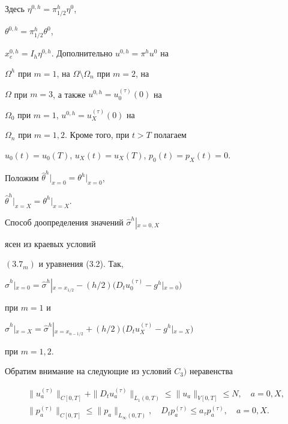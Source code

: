 \documentclass[12pt]{article}
\theoremstyle{plain} %
\theoremstyle{definition}
\numberwithin{equation}{section}
\begin{document}
Здесь $\eta^{0,h}=\pi^h_{1/2}\eta^0$,


$\theta^{0,h}=\pi^h_{1/2}\theta^0$,


$x^{0,h}_{e}=I_h\eta^{0,h}$. Дополнительно $u^{0,h}=\pi^hu^0$ на


$\Omega^h$ при $m=1$, на $\Omega\setminus\Omega_n$ при $m=2$, на


$\Omega$ при $m=3$, а также $u^{0,h}=u_0^{(\tau)}(0)$ на


$\Omega_0$ при $m=1$, $u^{0,h}=u_X^{(\tau)}(0)$ на


$\Omega_n$ при $m=1,2$. Кроме того, при $t>T$ полагаем


$u_0(t)=u_0(T)$, $u_X(t)=u_X(T)$, $p_0(t)=p_X(t)=0$.





Положим $\widehat\theta^h\bigr|_{x=0}=\theta^h\bigr|_{x=0}$,


$\widehat\theta^h\bigr|_{x=X}=\theta^h\bigr|_{x=X}$.


Способ доопределения значений $\widehat\sigma^h\left|_{x=0,X}\right.$


ясен из краевых условий


$(3.7_m)$ и уравнения (3.2). Так,


$\widehat\sigma^h\left|_{x=0}\right.=


\widehat\sigma^h\left|_{x=x_{1/2}}\right.


-(h/2)\bigl(D_tu_0^{(\tau)}-g^h\left|_{x=0}\right.\bigr)$


при $m=1$ и


$\widehat\sigma^h\left|_{x=X}\right.=\widehat\sigma^h\left|_{x=x_{n-1/2}}\right.


+(h/2)\bigl(D_tu_X^{(\tau)}-g^h\left|_{x=X}\right.\bigr)$


при $m=1,2$.





Обратим внимание на следующие из условий $C_3)$ неравенства


\begin{gather}


\|u^{(\tau)}_a\|_{C[0,T]}+\|D_tu^{(\tau)}_a\|_{L_1(0,T)}


\le \|u_a\|_{V[0,T]}\le N,\quad


a=0,X, \tag{3.8}\\


%


\|p^{(\tau)}_a\|_{C[0,T]}\le \|p_a\|_{L_\infty(0,T)},\quad


D_tp^{(\tau)}_a\le a_\tau p^{(\tau)}_a,\quad


a=0,X.\tag{3.9}


\end{gather}
\end{document}
